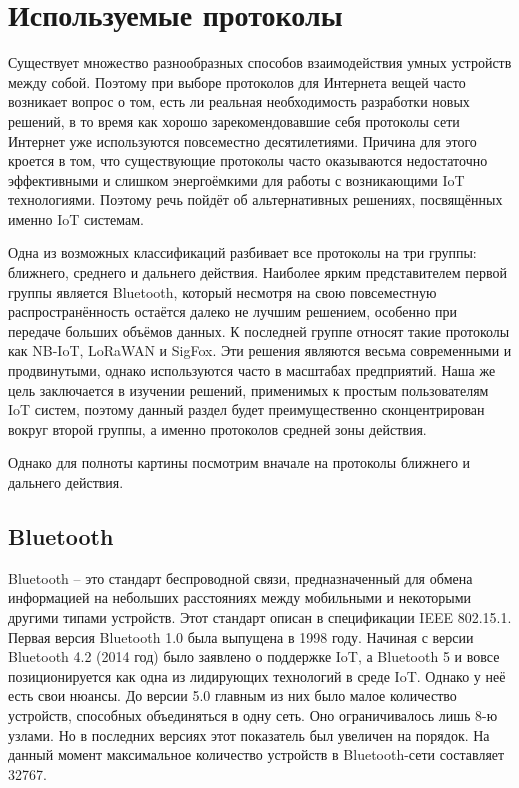 	
	\section{Используемые протоколы}
	
	Существует множество разнообразных способов взаимодействия умных устройств между собой. Поэтому
	при выборе протоколов для Интернета вещей часто возникает вопрос о том, есть ли реальная необходимость
	разработки новых решений, в то время как хорошо зарекомендовавшие себя протоколы сети Интернет уже
	используются повсеместно десятилетиями. Причина для этого кроется в том, что существующие протоколы
	часто оказываются недостаточно эффективными и слишком энергоёмкими для работы с возникающими
	IoT технологиями. Поэтому речь пойдёт об альтернативных решениях, посвящённых именно IoT системам.
	
	Одна из возможных классификаций разбивает все протоколы на три группы: ближнего, среднего и дальнего
	действия. Наиболее ярким представителем первой группы является Bluetooth, который несмотря на свою
	повсеместную распространённость остаётся далеко не лучшим решением, особенно при передаче больших
	объёмов данных. К последней группе относят такие протоколы как NB-IoT, LoRaWAN и SigFox.
	Эти решения являются весьма современными и продвинутыми, однако используются часто в масштабах
	предприятий. Наша же цель заключается в изучении решений, применимых к простым пользователям 
	IoT систем, поэтому данный раздел будет преимущественно сконцентрирован вокруг второй группы, 
	а именно протоколов средней зоны действия.
	
	Однако для полноты картины посмотрим вначале на протоколы ближнего и дальнего действия.
	
    \subsection{Bluetooth}
    
    Bluetooth – это стандарт беспроводной связи, предназначенный для обмена информацией на небольших 
    расстояниях между мобильными и некоторыми другими типами устройств. Этот стандарт описан в
    спецификации IEEE 802.15.1. Первая версия Bluetooth 1.0 была выпущена в 1998 году. Начиная с версии
    Bluetooth 4.2 (2014 год) было заявлено о поддержке IoT, а Bluetooth 5 и вовсе позиционируется как одна
    из лидирующих технологий в среде IoT. Однако у неё есть свои нюансы. До версии 5.0 главным из них 
    было малое количество устройств, способных объединяться в одну сеть. Оно ограничивалось лишь 8-ю узлами.
    Но в последних версиях этот показатель был увеличен на порядок. На данный момент максимальное количество
    устройств в Bluetooth-сети составляет 32767.
    
